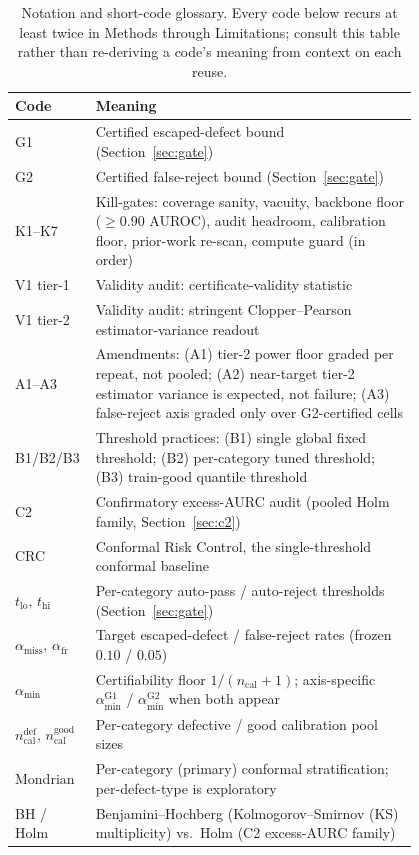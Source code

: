 \documentclass[preprint,11pt]{elsarticle}
\begin{document}
\begin{table}[!htbp]
  \centering
  \footnotesize
  \caption{Notation and short-code glossary. Every code below recurs at least twice in
  Methods through Limitations; consult this table rather than re-deriving a
  code's meaning from context on each reuse.}
  \label{tab:glossary}
  {\renewcommand{\arraystretch}{0.88}
  \begin{tabular}{@{}l >{\raggedright\arraybackslash}p{0.80\linewidth}@{}}
    \toprule
    Code & Meaning \\
    \midrule
    G1 & Certified escaped-defect bound (Section~\ref{sec:gate}) \\
    G2 & Certified false-reject bound (Section~\ref{sec:gate}) \\
    K1--K7 & Kill-gates: coverage sanity, vacuity, backbone floor ($\ge 0.90$ AUROC), audit
      headroom, calibration floor, prior-work re-scan, compute guard (in order) \\
    V1 tier-1 & Validity audit: certificate-validity statistic \\
    V1 tier-2 & Validity audit: stringent Clopper--Pearson estimator-variance readout \\
    A1--A3 & Amendments: (A1) tier-2 power floor graded per repeat, not pooled; (A2) near-target
      tier-2 estimator variance is expected, not failure; (A3) false-reject axis graded only over
      G2-certified cells \\
    B1/B2/B3 & Threshold practices: (B1) single global fixed threshold; (B2) per-category tuned
      threshold; (B3) train-good quantile threshold \\
    C2 & Confirmatory excess-AURC audit (pooled Holm family, Section~\ref{sec:c2}) \\
    CRC & Conformal Risk Control, the single-threshold conformal baseline \\
    $t_{\text{lo}},\,t_{\text{hi}}$ & Per-category auto-pass / auto-reject thresholds (Section~\ref{sec:gate}) \\
    $\alpha_{\text{miss}},\,\alpha_{\text{fr}}$ & Target escaped-defect / false-reject rates (frozen $0.10$ / $0.05$) \\
    $\alpha_{\min}$ & Certifiability floor $1/(n_{\text{cal}}+1)$; axis-specific
      $\alpha_{\min}^{\text{G1}}$ / $\alpha_{\min}^{\text{G2}}$ when both appear \\
    $n_{\text{cal}}^{\text{def}},\,n_{\text{cal}}^{\text{good}}$ & Per-category defective / good calibration pool sizes \\
    Mondrian & Per-category (primary) conformal stratification; per-defect-type is exploratory \\
    BH / Holm & Benjamini--Hochberg (Kolmogorov--Smirnov (KS) multiplicity) vs.\ Holm (C2 excess-AURC family) \\
    \bottomrule
  \end{tabular}}
\end{table}
\end{document}
